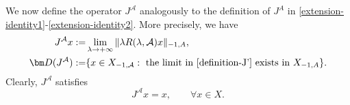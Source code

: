 \documentclass[onecolumn]{autart}
\def\la{\lambda}
\def\calA{{\mathcal{A}}}
\numberwithin{equation}{section}
\begin{document}
	
	We now define the operator $J^\calA$ analogously to the definition of $J^A$ in \eqref{extension-identity1}-\eqref{extension-identity2}. More precisely, we have
	\begin{align}
		 J^\calA x:=&\lim_{\la \to +\infty} \Vert \la R(\la,\calA)x\Vert_{-1,A},\label{definition-J'}\\
		  {\bm D}(J^\calA):=&\{x\in X_{-1,\calA}: \text{ the limit in \eqref{definition-J'}}\text{ exists in } X_{-1,A}\}. \notag
	\end{align}
	Clearly, $J^\calA$ satisfies
	\begin{equation}\label{extension-identityJ'}
		J^\calA x=x,\qquad \forall x\in X.
	\end{equation}
	
\end{document}
